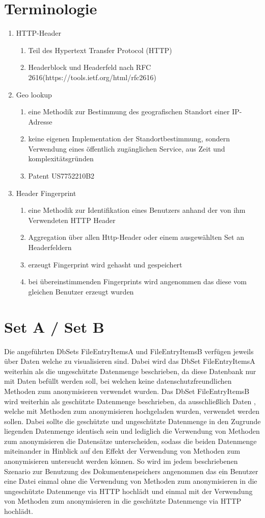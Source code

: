 \documentclass[
    fontsize=12pt,
    headings=small,
    parskip=half,           %
    bibliography=totoc,
    numbers=noenddot,       %
    open=any,               %
    ]{scrreprt}
\begin{document}
\section{Terminologie}
\begin{enumerate}
\item HTTP-Header
\begin{enumerate}
\item Teil des Hypertext Transfer Protocol (HTTP)
\item Headerblock und Headerfeld nach RFC 2616(https://tools.ietf.org/html/rfc2616)
\end{enumerate}
\item Geo lookup
\begin{enumerate}
\item eine Methodik zur Bestimmung des geografischen Standort einer IP-Adresse
\item keine eigenen Implementation der Standortbestimmung, sondern Verwendung eines öffentlich zugänglichen Service, aus Zeit und komplexitätsgründen
\item Patent US7752210B2
\end{enumerate}
\item Header Fingerprint
\begin{enumerate}
\item eine Methodik zur Identifikation eines Benutzers anhand der von ihm Verwendeten HTTP Header
\item Aggregation über allen Http-Header oder einem ausgewählten Set an Headerfeldern 
\item erzeugt Fingerprint wird gehasht und gespeichert
\item bei übereinstimmenden Fingerprints wird angenommen das diese vom gleichen Benutzer erzeugt wurden 
\end{enumerate}
\end{enumerate}
\newpage
\section{Set A / Set B}

Die angeführten DbSets FileEntryItemsA und FileEntryItemsB verfügen jeweils über Daten welche zu visualisieren sind. Dabei wird das DbSet FileEntryItemsA weiterhin als die ungeschützte Datenmenge beschrieben, da diese Datenbank nur mit Daten befüllt werden soll, bei welchen keine datenschutzfreundlichen Methoden zum anonymisieren verwendet wurden. Das DbSet FileEntryItemsB wird weiterhin als geschützte Datenmenge beschrieben, da ausschließlich Daten , welche mit Methoden zum anonymisieren hochgeladen wurden, verwendet werden sollen. Dabei sollte die geschützte und ungeschützte Datenmenge in den Zugrunde liegenden Datenmenge identisch sein und lediglich die Verwendung von Methoden zum anonymisieren die Datensätze unterscheiden, sodass die beiden Datenmenge miteinander in Hinblick auf den Effekt der Verwendung von Methoden zum anonymisieren untersucht werden können. 
So wird im jedem beschriebenen Szenario zur Benutzung des Dokumentenspeichers angenommen das ein Benutzer eine Datei einmal ohne die Verwendung von Methoden zum anonymisieren in die ungeschützte Datenmenge via HTTP hochlädt und einmal mit der Verwendung von Methoden zum anonymisieren in die geschützte Datenmenge via HTTP hochlädt.
\end{document}
